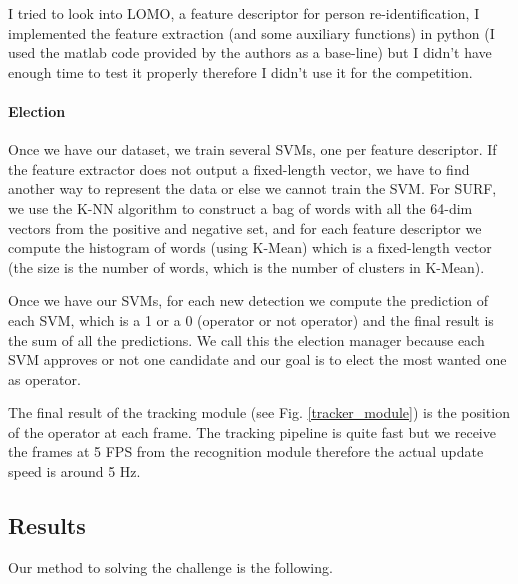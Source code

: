 \documentclass[a4paper, twocolumn]{article}
\begin{document}
    I tried to look into LOMO\cite{2014arXiv1406.4216L}, a feature descriptor for person re-identification, I implemented the feature extraction (and some auxiliary functions) in python (I used the matlab code provided by the authors as a base-line) but I didn't have enough time to test it properly therefore I didn't use it for the competition.
    
    \paragraph{Election} Once we have our dataset, we train several SVMs, one per feature descriptor. If the feature extractor does not output a fixed-length vector, we have to find another way to represent the data or else we cannot train the SVM. For SURF, we use the K-NN algorithm to construct a bag of words with all the 64-dim vectors from the positive and negative set, and for each feature descriptor we compute the histogram of words (using K-Mean) which is a fixed-length vector (the size is the number of words, which is the number of clusters in K-Mean).
    
    Once we have our SVMs, for each new detection we compute the prediction of each SVM, which is a 1 or a 0 (operator or not operator) and the final result is the sum of all the predictions. We call this the election manager because each SVM approves or not one candidate and our goal is to elect the most wanted one as operator.
    
    The final result of the tracking module (see Fig. \ref{tracker_module}) is the position of the operator at each frame. The tracking pipeline is quite fast but we receive the frames at 5 FPS from the recognition module therefore the actual update speed is around 5 Hz.
    
    \subsection{Results}
    
    Our method to solving the challenge is the following.
    
\end{document}

